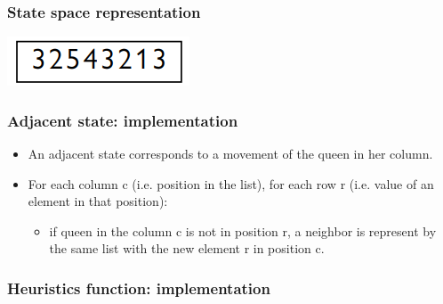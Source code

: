 \documentclass{beamer}
\begin{document}
    \begin{frame}
    \frametitle{State space representation}
        \includegraphics{Images/queens_position.png}
        \centering
    \end{frame}

    \begin{frame}
    \frametitle{Adjacent state: implementation}
        \begin{itemize}
            \item An adjacent state corresponds to a movement of the queen in her column.
            \pause
            \item For each column c (i.e. position in the list), for each row r (i.e. value of an element in that position): 
            \pause
            \begin{itemize}
                \item if queen in the column c is not in position r, a neighbor is represent by the same list with the new element r in position c.
            \end{itemize}
        \end{itemize}
    \end{frame}

    \begin{frame}
    \frametitle{Heuristics function: implementation}
        
    \end{frame}
\end{document}
